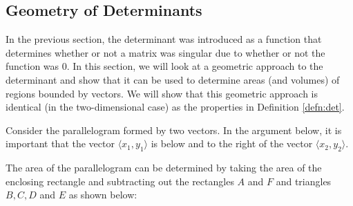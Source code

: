 \subsection{Geometry of Determinants}


In the previous section, the determinant was introduced as a function that determines whether or not a matrix was singular due to whether or not the function was 0.  In this section, we will look at a geometric approach to the determinant and show that it can be used to determine areas (and volumes) of regions bounded by vectors.  We will show that this geometric approach is identical (in the two-dimensional case) as the properties in Definition \ref{defn:det}.  


Consider the parallelogram formed by two vectors. In the argument below, it is important that the vector $\langle x_1, y_1 \rangle$ is below and to the right of the vector $\langle x_2, y_2 \rangle$.  
%
\begin{center}
\end{center}

The area of the parallelogram can be determined by taking the area of the enclosing rectangle and subtracting out the rectangles $A$ and $F$ and triangles $B, C, D$ and $E$ as shown below:

\begin{center}
\end{center}


